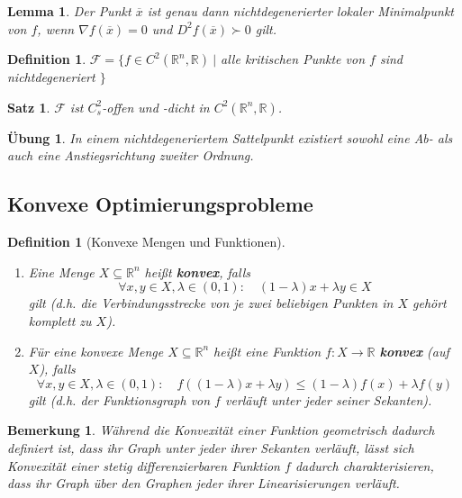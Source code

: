 \documentclass[11pt]{scrreprt}
\newcounter{thm}
\numberwithin{thm}{section}
\newtheorem{definition}[thm]{Definition}
\newtheorem{lemma}[thm]{Lemma}
\newtheorem{satz}[thm]{Satz}
\newtheorem{uebung}[thm]{Übung}
\newtheorem*{bemerkung*}{Bemerkung}
\newtheorem*{definition*}{Definition}
\begin{document}
\begin{lemma}
	Der Punkt $\overline{x}$ ist genau dann nichtdegenerierter lokaler Minimalpunkt von $f$, wenn $\nabla f(\overline{x}) = 0$ und $D^2 f(\overline{x}) \succ 0$ gilt.
\end{lemma}

\begin{definition*}
	$\mathcal{F} = \big\{ f \in C^2(\mathbb{R}^n, \mathbb{R}) ~|$ alle kritischen Punkte von $f$ sind nichtdegeneriert $\big\}$	
\end{definition*}

\begin{satz}
	$\mathcal{F}$ ist $C_s^2$-offen und -dicht in $C^2(\mathbb{R}^n, \mathbb{R})$.
\end{satz}

\begin{uebung}
	In einem nichtdegeneriertem Sattelpunkt existiert sowohl eine Ab- als auch eine Anstiegsrichtung zweiter Ordnung.
\end{uebung}

\subsection*{Konvexe Optimierungsprobleme}

\begin{definition}[Konvexe Mengen und Funktionen] ~\
	\begin{enumerate}[label=\alph*\upshape)]
		\item Eine Menge $X \subseteq \mathbb{R}^n$ heißt \textbf{konvex}, falls
			$$ \forall x,y \in X, \lambda \in (0, 1): \quad (1-\lambda) x + \lambda y \in X $$
			gilt (d.h. die Verbindungsstrecke von je zwei beliebigen Punkten in $X$ gehört komplett zu $X$).
		\item Für eine konvexe Menge $X \subseteq \mathbb{R}^n$ heißt eine Funktion $f \colon X \rightarrow \mathbb{R}$ \textbf{konvex} (auf $X$), falls
			$$ \forall x, y \in X, \lambda \in (0, 1): \quad f((1-\lambda) x + \lambda y) \leq (1-\lambda) f(x) + \lambda f(y) $$
			gilt (d.h. der Funktionsgraph von $f$ verläuft unter jeder seiner Sekanten).
	\end{enumerate}
\end{definition}

\begin{bemerkung*}
	Während die Konvexität einer Funktion geometrisch dadurch definiert ist, dass ihr Graph unter jeder ihrer Sekanten verläuft, lässt sich Konvexität einer stetig differenzierbaren Funktion $f$ dadurch charakterisieren, dass ihr Graph über den Graphen jeder ihrer Linearisierungen verläuft.	
\end{bemerkung*}
\end{document}
